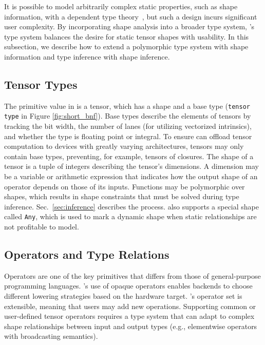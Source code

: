 It is possible to model arbitrarily complex static properties, such
  as shape information, with a dependent type theory~\cite{selsam_certigrad}, but such
  a design incurs significant user complexity.
By incorporating shape analysis into a broader type system,
  \relay's type system balances the desire for static tensor shapes
  with usability.
In this subsection, we describe how to extend a polymorphic type system with shape
  information and type inference with shape inference.

\subsection*{Tensor Types}

The primitive value in \relay is a tensor, which has
  a shape and a base type (\verb|tensor type| in Figure \ref{fig:short_bnf}).
Base types describe the elements of tensors by tracking
  the bit width,
  the number of lanes (for utilizing vectorized intrinsics),
  and whether the type is floating point or integral.
To ensure \relay can offload tensor computation to devices
  with greatly varying architectures,
  \relay tensors may only contain base types,
  preventing, for example, tensors of closures.
The shape of a tensor is a tuple of integers describing the tensor's dimensions.
A dimension may be a variable or arithmetic expression that indicates how the
  output shape of an operator depends on those of its inputs.
Functions may be polymorphic over shapes, which results
  in shape constraints that must be solved during type inference.
Sec.~\ref{sec:inference} describes the process.
\relay also supports a special shape called \verb|Any|, which is used
  to mark a dynamic shape when static relationships are not profitable
  to model.

\subsection*{Operators and Type Relations}
Operators are one of the key primitives that differs from those of
  general-purpose programming languages.
\relay's use of opaque operators enables backends to choose different
  lowering strategies based on the hardware target.
\relay's operator set is extensible, meaning that users may add new operations.
Supporting common or user-defined tensor operators requires a type system that can
  adapt to complex shape relationships between input and output types
  (e.g., elementwise operators with broadcasting semantics).

